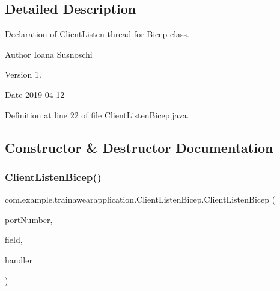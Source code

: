 \subsection{Detailed Description}
Declaration of \mbox{\hyperlink{classcom_1_1example_1_1trainawearapplication_1_1_client_listen}{Client\+Listen}} thread for Bicep class. 

\begin{DoxyAuthor}{Author}
Ioana Susnoschi 
\end{DoxyAuthor}
\begin{DoxyVersion}{Version}
1. 
\end{DoxyVersion}
\begin{DoxyDate}{Date}
2019-\/04-\/12 
\end{DoxyDate}


Definition at line 22 of file Client\+Listen\+Bicep.\+java.



\subsection{Constructor \& Destructor Documentation}
\mbox{\label{classcom_1_1example_1_1trainawearapplication_1_1_client_listen_bicep_a7a29935d4f0dd55a5dd0c0f5f93eba8c}} 
\subsubsection{\texorpdfstring{ClientListenBicep()}{ClientListenBicep()}}
{\footnotesize\ttfamily com.\+example.\+trainawearapplication.\+Client\+Listen\+Bicep.\+Client\+Listen\+Bicep (\begin{DoxyParamCaption}\item[{int}]{port\+Number,  }\item[{Text\+View}]{field,  }\item[{\mbox{\hyperlink{classcom_1_1example_1_1trainawearapplication_1_1_udp_client_handler_bicep}{Udp\+Client\+Handler\+Bicep}}}]{handler }\end{DoxyParamCaption})\hspace{0.3cm}{\ttfamily [inline]}}



